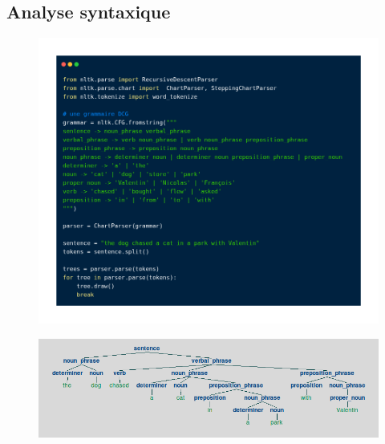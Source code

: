 \subsection{Analyse syntaxique}
\begin{frame}{\subsecname}
\begin{figure}[ht]
\includegraphics[scale=.25]{img/analyse_syntaxique_nltk.png}
\end{figure}
\end{frame}

\begin{frame}{\subsecname}
\begin{figure}[ht]
\includegraphics[scale=.4]{img/analyse_syntaxique_output_nltk.png}
\end{figure}
\end{frame}

